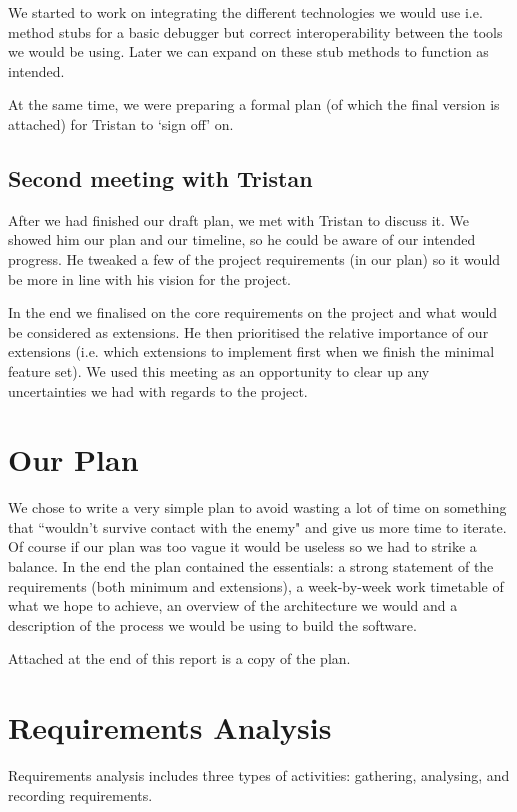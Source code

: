 \documentclass[11pt, a4paper]{article}
\begin{document}
We started to work on integrating the different technologies we would use
i.e. method stubs for a basic debugger but correct interoperability between the
tools we would be using.  Later we can expand on these stub methods to function
as intended.

At the same time, we were preparing a formal plan (of which the final
version is attached) for Tristan to `sign off' on. 

\subsection{Second meeting with Tristan}
After we had finished our draft plan, we met with Tristan to discuss it. We
showed him our plan and our timeline, so he could be aware of our intended
progress. He tweaked a few of the project requirements (in our plan) so it
would be more in line with his vision for the project. 

In the end we finalised on the core requirements on the project and what
would be considered as extensions. He then prioritised the relative
importance of our extensions (i.e. which extensions to implement first when
we finish the minimal feature set). We used this meeting as an
opportunity to clear up any uncertainties we had with regards to the
project.

\section{Our Plan}

We chose to write a very simple plan to avoid wasting a lot of time on something that ``wouldn't survive contact with the enemy" and give us more time to iterate. 
Of course if our plan was too vague it would be useless so we had to strike a balance.
In the end the plan contained the essentials: a strong statement of the requirements (both minimum and extensions), a week-by-week work timetable of what we hope to achieve, an overview of the architecture we would and a description of the process we would be using to build the software.

Attached at the end of this report is a copy of the plan.

\section{Requirements Analysis}
Requirements analysis includes three types of activities: gathering, analysing, and recording requirements. 
\end{document}

